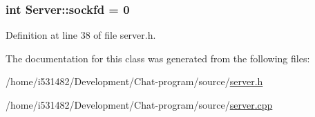 \subsubsection[{\texorpdfstring{sockfd}{sockfd}}]{\setlength{\rightskip}{0pt plus 5cm}int Server\+::sockfd = 0\hspace{0.3cm}{\ttfamily [private]}}\hypertarget{class_server_a284abf5ae92eeed0f5e28759d382dd2d}{}\label{class_server_a284abf5ae92eeed0f5e28759d382dd2d}


Definition at line 38 of file server.\+h.



The documentation for this class was generated from the following files\+:\begin{DoxyCompactItemize}
\item 
/home/i531482/\+Development/\+Chat-\/program/source/\hyperlink{server_8h}{server.\+h}\item 
/home/i531482/\+Development/\+Chat-\/program/source/\hyperlink{server_8cpp}{server.\+cpp}\end{DoxyCompactItemize}
